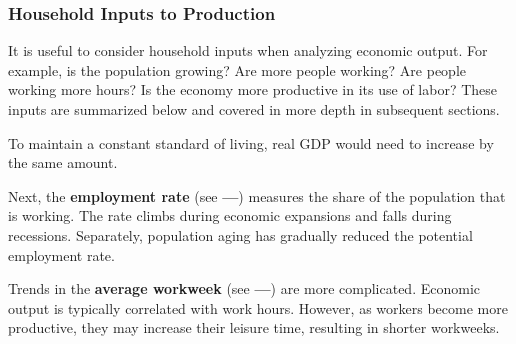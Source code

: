 \subsubsection*{Household Inputs to Production}
\begin{minipage}{0.76\textwidth}
\small It is useful to consider household inputs when analyzing economic output. For example, is the population growing? Are more people working? Are people working more hours? Is the economy more productive in its use of labor? These inputs are summarized below and covered in more depth in subsequent sections.

To maintain a constant standard of living, real GDP would need to increase by the same amount. 

Next, the \textbf{employment rate} (see {\color{green!30!teal!80!black}\textbf{---}}) measures the share of the population that is working. The rate climbs during economic expansions and falls during recessions. Separately, population aging has gradually reduced the potential employment rate. 

Trends in the \textbf{average workweek} (see {\color{blue}\textbf{---}}) are more complicated. Economic output is typically correlated with work hours. However, as workers become more productive, they may increase their leisure time, resulting in shorter workweeks. 
\end{minipage}
\vspace{1mm}

\gdpjobslvlmo

\begin{minipage}{0.36\textwidth}
\\
\end{minipage} \hspace{5mm}
\begin{minipage}{0.36\textwidth}
\\
\end{minipage}
\vspace{2mm}

